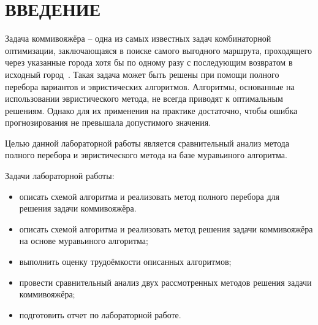 \section*{ВВЕДЕНИЕ}

Задача коммивояжёра -- одна из самых известных задач комбинаторной оптимизации, заключающаяся в поиске самого выгодного маршрута, проходящего через указанные города хотя бы по одному разу с последующим возвратом в исходный город~\cite{kom}. Такая задача может быть решены при помощи полного перебора вариантов и эвристических алгоритмов. Алгоритмы, основанные на использовании эвристического метода, не всегда приводят к оптимальным решениям. Однако для их применения на практике достаточно, чтобы ошибка прогнозирования не превышала допустимого значения.

Целью данной лабораторной работы является сравнительный анализ метода полного перебора и эвристического метода на базе муравьиного алгоритма. 

Задачи лабораторной работы:
\begin{itemize}[label*=---]
	\item описать схемой алгоритма и реализовать метод полного перебора для решения задачи коммивояжёра.
	\item описать схемой алгоритма и реализовать метод решения задачи коммивояжёра на основе муравьиного алгоритма;
	\item выполнить оценку трудоёмкости описанных алгоритмов;
	\item провести сравнительный анализ двух рассмотренных методов решения задачи коммивояжёра;
	\item подготовить отчет по лабораторной работе.
\end{itemize}
